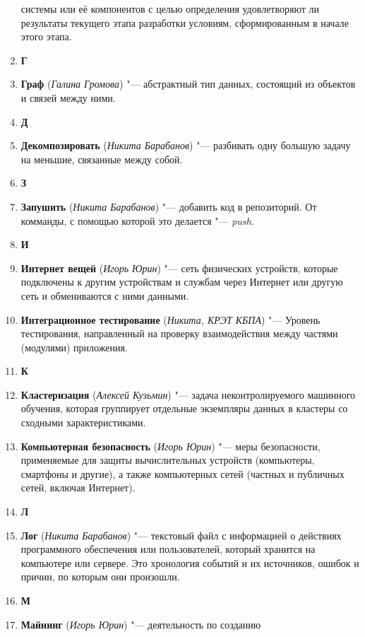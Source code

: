 \documentclass[a4paper, 14 pt]{extarticle}
\begin{document}
\begin{enumerate}
    системы или её компонентов с целью определения удовлетворяют ли результаты 
    текущего этапа разработки условиям, сформированным в начале этого этапа.
    \item[] \textbf{Г} 
    \item \textbf{Граф} (\textit{Галина Громова}) "--- абстрактный тип данных, 
    состоящий из объектов и связей между ними.
    \item[] \textbf{Д} 
    \item \textbf{Декомпозировать} (\textit{Никита Барабанов}) "--- разбивать 
    одну большую задачу на меньшие, связанные между собой.
    \\
    \item[] \textbf{З}
    \item \textbf{Запушить} (\textit{Никита Барабанов}) "--- добавить код в 
    репозиторий. От комманды, с помощью которой это делается "--- \textit{push}.
    \item[] \textbf{И} 
    \item \textbf{Интернет вещей} (\textit{Игорь Юрин}) "--- сеть физических 
    устройств, которые подключены к другим устройствам и службам через Интернет 
    или другую сеть и обмениваются с ними данными.
    \item \textbf{Интеграционное тестирование} (\textit{Никита, КРЭТ КБПА}) "---
    Уровень тестирования, направленный на проверку взаимодействия между частями 
    (модулями) приложения. 
    \item[] \textbf{К}
    \item \textbf{Кластеризация} (\textit{Алексей Кузьмин}) "--- 
    задача неконтролируемого машинного обучения, которая группирует отдельные 
    экземпляры данных в кластеры со сходными характеристиками.
    \item \textbf{Компьютерная безопасность} (\textit{Игорь Юрин}) "--- меры 
    безопасности, применяемые для защиты вычислительных устройств (компьютеры, 
    смартфоны и другие), а также компьютерных сетей (частных и публичных сетей, 
    включая Интернет). 
    \item[] \textbf{Л}
    \item \textbf{Лог} (\textit{Никита Барабанов}) "--- текстовый файл с 
    информацией о действиях программного обеспечения или пользователей, который 
    хранится на компьютере или сервере. Это хронология событий и их источников, 
    ошибок и причин, по которым они произошли.
    \item[] \textbf{М}
    \item \textbf{Майнинг} (\textit{Игорь Юрин}) "--- деятельность по созданию 

\end{enumerate}
\end{document}
